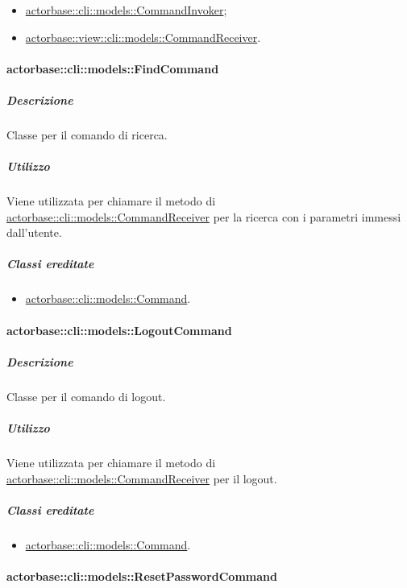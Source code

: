 \documentclass{scalatekids-article}
\begin{document}
\begin{itemize}
\item \hyperref[sec:actorbase::cli::models::CommandInvoker]{actorbase::cli::models::CommandInvoker};
\item \hyperref[sec:actorbase::view::cli::models::CommandReceiver]{actorbase::view::cli::models::CommandReceiver}.
\end{itemize}

\paragraph{actorbase::cli::models::FindCommand}
\label{sec:actorbase::cli::models::FindCommand}

\subparagraph{Descrizione}

Classe per il comando di ricerca.

\subparagraph{Utilizzo}

Viene utilizzata per chiamare il metodo di
\hyperref[sec:actorbase::cli::models::CommandReceiver]{actorbase::cli::models::CommandReceiver} per la ricerca con i parametri immessi
dall'utente.

\subparagraph{Classi ereditate}

\begin{itemize}
\item \hyperref[sec:actorbase::cli::models::Command]{actorbase::cli::models::Command}.
\end{itemize}

\paragraph{actorbase::cli::models::LogoutCommand}
\label{sec:actorbase::cli::models::LogoutCommand}

\subparagraph{Descrizione}

Classe per il comando di logout.

\subparagraph{Utilizzo}

Viene utilizzata per chiamare il metodo di
\hyperref[sec:actorbase::cli::models::CommandReceiver]{actorbase::cli::models::CommandReceiver} per il logout.

\subparagraph{Classi ereditate}

\begin{itemize}
\item \hyperref[sec:actorbase::cli::models::Command]{actorbase::cli::models::Command}.
\end{itemize}

\paragraph{actorbase::cli::models::ResetPasswordCommand}
\label{sec:actorbase::cli::models::ResetPasswordCommand}
\end{document}
